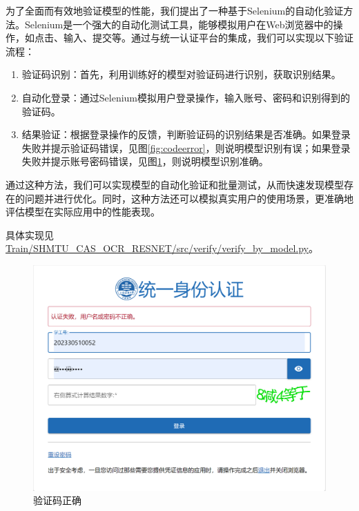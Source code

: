为了全面而有效地验证模型的性能，我们提出了一种基于Selenium的自动化验证方法。Selenium是一个强大的自动化测试工具，能够模拟用户在Web浏览器中的操作，如点击、输入、提交等。通过与统一认证平台的集成，我们可以实现以下验证流程：

\begin{enumerate}
	\item 验证码识别：首先，利用训练好的模型对验证码进行识别，获取识别结果。
	\item 自动化登录：通过Selenium模拟用户登录操作，输入账号、密码和识别得到的验证码。
	\item 结果验证：根据登录操作的反馈，判断验证码的识别结果是否准确。如果登录失败并提示验证码错误，见图\ref{fig:codeerror}，则说明模型识别有误；如果登录失败并提示账号密码错误，见图\ref{fig:codecorrect}，则说明模型识别准确。
\end{enumerate}

通过这种方法，我们可以实现模型的自动化验证和批量测试，从而快速发现模型存在的问题并进行优化。同时，这种方法还可以模拟真实用户的使用场景，更准确地评估模型在实际应用中的性能表现。

具体实现见\url{Train/SHMTU_CAS_OCR_RESNET/src/verify/verify_by_model.py}。

\begin{figure}
	\centering
	\includegraphics[width=0.9\linewidth]{Resources/Picture/CAS/code_correct}
	\caption{验证码正确}
	\label{fig:codecorrect}
\end{figure}

